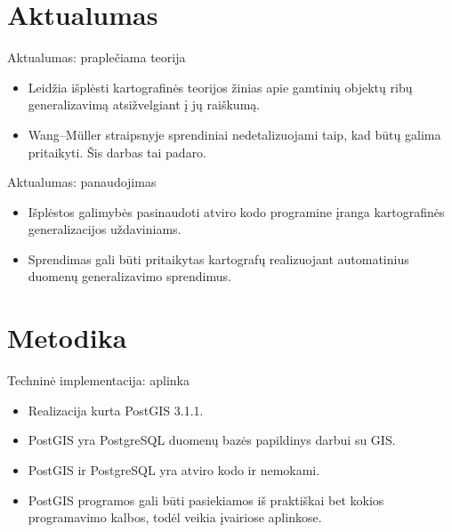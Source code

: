 \documentclass[14pt]{beamer}
\newcommand{\WM}{Wang--M{\"u}ller}
\begin{document}
\section{Aktualumas}

\begin{frame}{Aktualumas: praplečiama teorija}
    \begin{itemize}[<+->]
        \item Leidžia išplėsti kartografinės teorijos žinias apie gamtinių
            objektų ribų generalizavimą atsižvelgiant į jų raiškumą.
        \item {\WM} straipsnyje sprendiniai nedetalizuojami taip, kad būtų
            galima pritaikyti. Šis darbas tai padaro.
    \end{itemize}
\end{frame}

\begin{frame}{Aktualumas: panaudojimas}
    \begin{itemize}[<+->]
        \item Išplėstos galimybės pasinaudoti atviro
            kodo programine įranga kartografinės generalizacijos
            uždaviniams.
        \item Sprendimas gali būti pritaikytas kartografų realizuojant
            automatinius duomenų generalizavimo sprendimus.
    \end{itemize}
\end{frame}


\section{Metodika}

\begin{frame}{Techninė implementacija: aplinka}
    \begin{itemize}[<+->]
        \item Realizacija kurta PostGIS 3.1.1.

        \item PostGIS yra PostgreSQL duomenų bazės papildinys darbui su GIS.

        \item PostGIS ir PostgreSQL yra atviro kodo ir nemokami.
            
        \item PostGIS programos gali būti pasiekiamos iš praktiškai bet kokios
            programavimo kalbos, todėl veikia įvairiose aplinkose.

    \end{itemize}
\end{frame}
\end{document}
